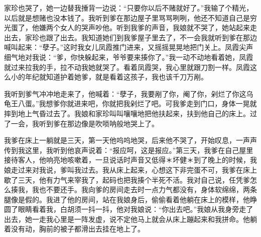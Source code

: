 \documentclass[12pt,UTF8]{ctexbook}
\begin{document}
家珍也哭了，她一边替我捶背一边说：“只要你以后不赌就好了。”我输了个精光，以后就是想赌也没本钱了。我听到爹在那边屋子里骂骂咧咧，他还不知道自己是穷光蛋了，他嫌两个女人的哭声吵他。听到我爹的声音，我娘就不哭了，她站起来走出去，家珍也跟了出去。我知道她们到我爹屋子里去了，不一会我就听到爹在那边喊叫起来：“孽子。”这时我女儿凤霞推门进来，又摇摇晃晃地把门关上。凤霞尖声细气地对我说：“爹，你快躲起来，爷爷要来揍你了。”我一动不动地看着她，凤霞就过来拉我的手，拉不动我她就哭了。看着凤霞哭，我心里就跟刀割一样。凤霞这么小的年纪就知道护着她爹，就是看着这孩子，我也该千刀万剐。

我听到爹气冲冲地走来了，他喊着：“孽子，我要剐了你，阉了你，剁烂了你这乌龟王八蛋。”我想爹你就进来吧，你就把我剁烂了吧。可我爹走到门口，身体一晃就摔到地上气昏过去了。我娘和家珍叫叫嚷嚷地把他扶起来，扶到他自己的床上。过了一会，我听到爹在那边像是吹唢呐般地哭上了。

我爹在床上一躺就是三天，第一天他呜呜地哭，后来他不哭了，开始叹息，一声声传到我这里，我听到他哀声说着：“报应呵，这是报应。”第三天，我爹在自己屋里接待客人，他响亮地咳嗽着，一旦说话时声音又低得＊坏健＊到了晚上的时候，我娘走过来对我说，爹叫我过去。我从床上起来，心想这下非完蛋不可，我爹在床上歇了三天，他有力气来宰我了，起码也把我揍个半死不活。我对自己说，任凭爹怎么揍我，我也不要还手。我向爹的房间走去时一点力气都没有，身体软绵绵，两条腿像是假的。我进了他的房间，站在我娘身后，偷偷看着他躺在床上的模样，他睁圆了眼睛看着我，白胡须一抖一抖，他对我娘说：“你出去吧。”我娘从我身旁走了出去，她一走我心里是一阵发虚，说不定他马上就会从床上蹦起来和我拼命。他躺着没有动，胸前的被子都滑出去挂在地上了。
\end{document}
